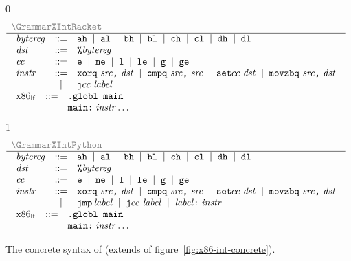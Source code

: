 \documentclass[7x10]{TimesAPriori_MIT}%
\newcommand{\gray}[1]{{\color{gray} #1}}
\def\racketEd{0}
\def\pythonEd{1}
\def\edition{1}
\numberwithin{theorem}{chapter}
\numberwithin{definition}{chapter}
\numberwithin{equation}{chapter}
\begin{document}
\newcommand{\GrammarXIfRacket}{
\begin{array}{lcl}
  \itm{bytereg} &::=& \key{ah} \MID \key{al} \MID \key{bh} \MID \key{bl}
    \MID \key{ch} \MID \key{cl} \MID \key{dh} \MID \key{dl} \\
\Dst &::=& \key{\%}\itm{bytereg}\\
\itm{cc} & ::= & \key{e} \MID \key{ne} \MID \key{l} \MID \key{le} \MID \key{g} \MID \key{ge} \\
\Instr &::=& \key{xorq}~\Src\key{,}~\Dst
   \MID \key{cmpq}~\Src\key{,}~\Src
    \MID  \key{set}cc~\Dst 
    \MID \key{movzbq}~\Src\key{,}~\Dst \\
    &\MID& \key{j}cc~\itm{label} \\
\end{array}
}

\newcommand{\GrammarXIfPython}{
\begin{array}{lcl}
  \itm{bytereg} &::=& \key{ah} \MID \key{al} \MID \key{bh} \MID \key{bl}
    \MID \key{ch} \MID \key{cl} \MID \key{dh} \MID \key{dl} \\
\Dst &::=& \key{\%}\itm{bytereg}\\
\itm{cc} & ::= & \key{e} \MID \key{ne} \MID \key{l} \MID \key{le} \MID \key{g} \MID \key{ge} \\
\Instr &::=& \key{xorq}~\Src\key{,}~\Dst
   \MID \key{cmpq}~\Src\key{,}~\Src
    \MID  \key{set}cc~\Dst 
    \MID \key{movzbq}~\Src\key{,}~\Dst \\
    &\MID& \key{jmp}\,\itm{label} \MID \key{j}cc~\itm{label} 
           \MID \itm{label}\key{:}\; \Instr 
\end{array}
}


\begin{figure}[tp]
  \begin{tcolorbox}[colback=white]
{\if\edition\racketEd    
\[
\begin{array}{l}
  \gray{\GrammarXIntRacket} \\ \hline
  \GrammarXIfRacket \\ 
\begin{array}{lcl}
\LangXIfM{} &::= &  \key{.globl main} \\
      &    & \key{main:} \; \Instr\ldots 
\end{array}
\end{array}
\]
\fi}
{\if\edition\pythonEd    
\[
\begin{array}{l}
  \gray{\GrammarXIntPython} \\ \hline
  \GrammarXIfPython \\ 
\begin{array}{lcl}
\LangXIfM{} &::= &  \key{.globl main} \\
      &    & \key{main:} \; \Instr\ldots 
\end{array}
\end{array}
\]
\fi}
\end{tcolorbox}
\caption{The concrete syntax of \LangXIf{}  (extends \LangXInt{} of figure~\ref{fig:x86-int-concrete}).}
\label{fig:x86-1-concrete}
\end{figure}
\end{document}
